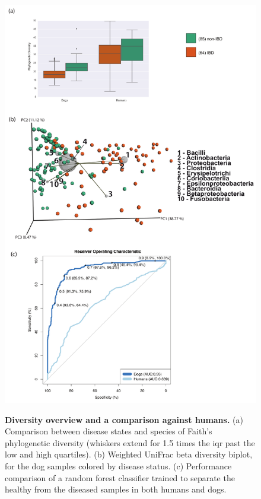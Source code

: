 \begin{figure}[htbp]
\includegraphics[height=0.85\textheight]{dogs-figures/figure-1}
\label{dogs_fig1}
\caption[Diversity overview and a comparison against humans.]{\textbf{Diversity overview and a comparison against humans.} (a) Comparison between disease states and species of Faith's phylogenetic diversity (whiskers extend for 1.5 times the \gls{iqr} past the low and high quartiles). (b) Weighted UniFrac beta diversity biplot, for the dog samples colored by disease status. (c) Performance comparison of a random forest classifier trained to separate the healthy from the diseased samples in both humans and dogs.}
\end{figure}

